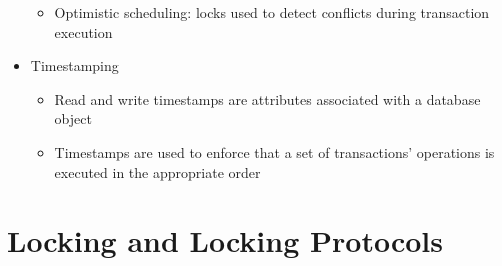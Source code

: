 \documentclass{report}
\begin{document}
\begin{itemize}
\begin{itemize}
			\item Optimistic scheduling: locks used to detect conflicts during transaction execution
		\end{itemize}
		\item Timestamping
		\begin{itemize}
			\item Read and write timestamps are attributes associated with a database object
			\item Timestamps are used to enforce that a set of transactions’ operations is executed in the appropriate order
		\end{itemize}
	\end{itemize}
	
	\section{Locking and Locking Protocols}
\end{document}
